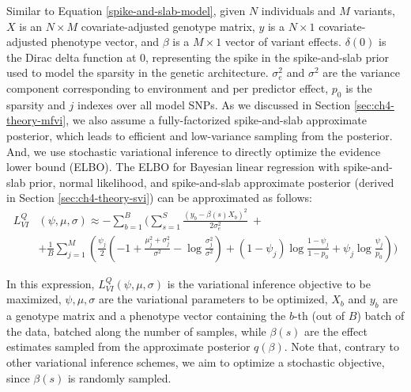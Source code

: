 Similar to Equation \ref{spike-and-slab-model}, given $N$ individuals and $M$ variants, $X$ is an $N \times M$ covariate-adjusted genotype matrix, $y$ is a $N \times 1$ covariate-adjusted phenotype vector, and $\beta$ is a $M \times 1$ vector of variant effects.
%
$\delta(0)$ is the Dirac delta function at 0, representing the spike in the spike-and-slab prior used to model the sparsity in the genetic architecture.
%
$\sigma_e^2$ and $\sigma^2$ are the variance component corresponding to environment and per predictor effect, $p_0$ is the sparsity and $j$ indexes over all model SNPs.
%
As we discussed in Section \ref{sec:ch4-theory-mfvi}, we also assume a fully-factorized spike-and-slab approximate posterior, which leads to efficient and low-variance sampling from the posterior.
%
And, we use stochastic variational inference to directly optimize the evidence lower bound (ELBO).
%
The ELBO for Bayesian linear regression with spike-and-slab prior, normal likelihood, and spike-and-slab approximate posterior (derived in Section \ref{sec:ch4-theory-svi}) can be approximated as follows: 
\begin{align}
    L^{Q}_{VI}&(\psi, \mu, \sigma) \approx - \sum\limits^{B}_{b=1} \Bigg( \sum\limits^{S}_{s=1} \frac{(y_b - \beta(s) X_b)^2}{2 \sigma_e^2} \ + \nonumber \\
    &+ \frac{1}{B}\sum\limits^{M}_{j=1} \left(  \frac{\psi_j}{2}\left(-1 + \frac{\mu_j^2 + \sigma_j^2}{\sigma^2} - \log \frac{\sigma_j^2}{\sigma^2} \right) + (1-\psi_j)\log\frac{1 - \psi_j}{1 - p_0} + \psi_j\log\frac{\psi_j}{p_0} \right) \Bigg) \label{elbo-loss-ss}
\end{align}

In this expression, $L^{Q}_{VI}(\psi, \mu, \sigma)$ is the variational inference objective to be maximized, $\psi, \mu, \sigma$ are the variational parameters to be optimized, $X_b$ and $y_b$ are a genotype matrix and a phenotype vector containing the $b$-th (out of $B$) batch of the data, batched along the number of samples, while $\beta(s)$ are the effect estimates sampled from the approximate posterior $q(\beta)$.
%
Note that, contrary to other variational inference schemes, we aim to optimize a stochastic objective, since $\beta(s)$ is randomly sampled.
%

